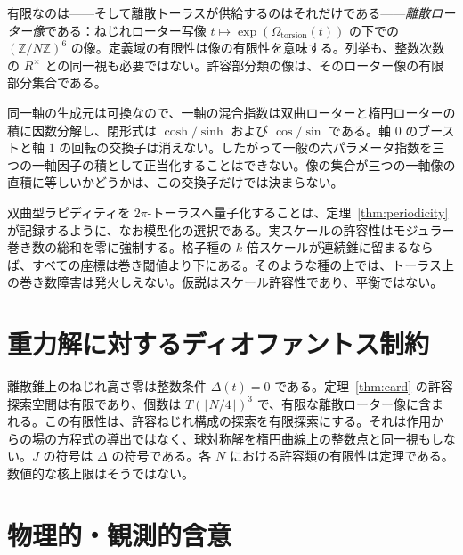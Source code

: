 \documentclass[a4paper]{article}
\theoremstyle{definition}
\begin{document}
有限なのは——そして離散トーラスが供給するのはそれだけである——\emph{離散ローター像}である：ねじれローター写像 $t\mapsto\exp(\Omega_{\mathrm{torsion}}(t))$ の下での $(\mathbb{Z}/N\mathbb{Z})^6$ の像。定義域の有限性は像の有限性を意味する。列挙も、整数次数の $R^\times$ との同一視も必要ではない。許容部分類の像は、そのローター像の有限部分集合である。

同一軸の生成元は可換なので、一軸の混合指数は双曲ローターと楕円ローターの積に因数分解し、閉形式は $\cosh/\sinh$ および $\cos/\sin$ である。軸 $0$ のブーストと軸 $1$ の回転の交換子は消えない。したがって一般の六パラメータ指数を三つの一軸因子の積として正当化することはできない。像の集合が三つの一軸像の直積に等しいかどうかは、この交換子だけでは決まらない。

双曲型ラピディティを $2\pi$-トーラスへ量子化することは、定理~\ref{thm:periodicity} が記録するように、なお模型化の選択である。実スケールの許容性はモジュラー巻き数の総和を零に強制する。格子種の $k$ 倍スケールが連続錐に留まるならば、すべての座標は巻き閾値より下にある。そのような種の上では、トーラス上の巻き数障害は発火しえない。仮説はスケール許容性であり、平衡ではない。

\section{重力解に対するディオファントス制約}
\label{sec:diophantine}

離散錐上のねじれ高さ零は整数条件 $\Delta(t)=0$ である。定理~\ref{thm:card} の許容探索空間は有限であり、個数は $T(\lfloor N/4\rfloor)^3$ で、有限な離散ローター像に含まれる。この有限性は、許容ねじれ構成の探索を有限探索にする。それは作用からの場の方程式の導出ではなく、球対称解を楕円曲線上の整数点と同一視もしない。$J$ の符号は $\Delta$ の符号である。各 $N$ における許容類の有限性は定理である。数値的な核上限はそうではない。

\section{物理的・観測的含意}
\label{sec:implications}
\end{document}
